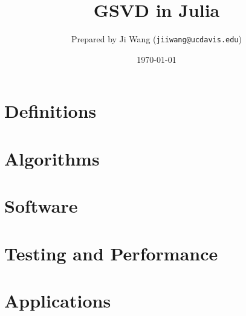 \documentclass[11pt]{article}
\title{GSVD in Julia}
\author{
Prepared by Ji Wang ({\tt jiiwang@ucdavis.edu})
}
\date{\today}
\numberwithin{equation}{section}
\begin{document}
\maketitle

\tableofcontents

\newpage
\section{Definitions}

\newpage

\section{Algorithms}

\newpage

\section{Software}
    
\newpage

\section{Testing and Performance}

\newpage

\section{Applications}

\newpage


 

\end{document}
